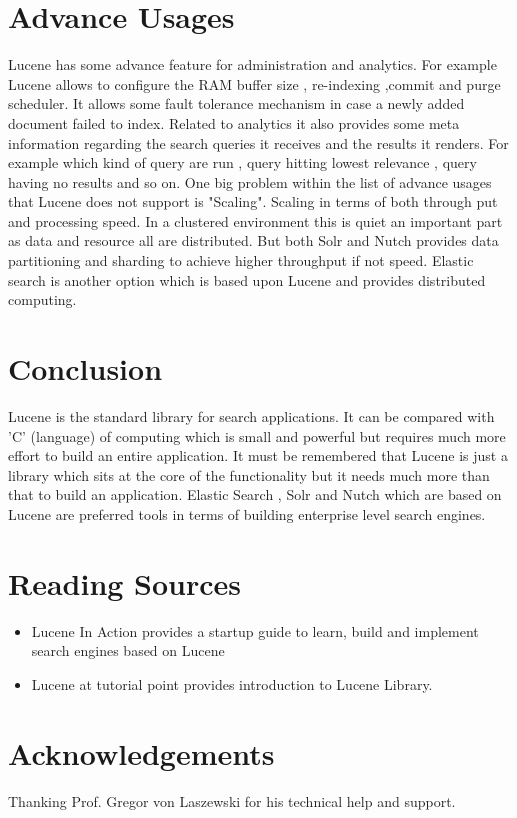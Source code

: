 \documentclass[9pt,twocolumn,twoside]{../../styles/osajnl}
\begin{document}
\section{Advance Usages}
Lucene has some advance feature for administration and analytics. For example Lucene allows to configure the RAM buffer size , re-indexing ,commit and purge scheduler. It allows some fault tolerance mechanism in case a newly added document failed to index. Related to analytics it also provides some meta information regarding the search queries it receives and the results it renders. For example which kind of query are run , query hitting lowest relevance , query having no results and so on. One big problem within the list of advance usages that Lucene does not support is "Scaling". Scaling in terms of both through put and processing speed. In a clustered environment this is quiet an important part as data and resource all are distributed. But both Solr and Nutch provides data partitioning and sharding to achieve higher throughput if not speed. Elastic search is another option which is based upon Lucene and provides distributed computing.


\section{Conclusion}
Lucene is the standard library for search applications. It can be compared with 'C' (language) of computing which is small and powerful but requires much more effort to build an entire application. It must be remembered that Lucene is just a library which sits at the core of the functionality but it needs much more than that to build an application. Elastic Search , Solr and Nutch which are based on Lucene are preferred tools in terms of building enterprise level search engines. 

\section{Reading Sources}

\begin{itemize}
\item Lucene In Action \cite{lucene-book} provides a startup guide to
learn, build and implement search engines based on Lucene 
\item Lucene at tutorial point \cite{www-lucene-tp} provides introduction
 to Lucene Library.
\end{itemize}



\section*{Acknowledgements}

Thanking Prof. Gregor von Laszewski for his technical help and support.




\end{document}
